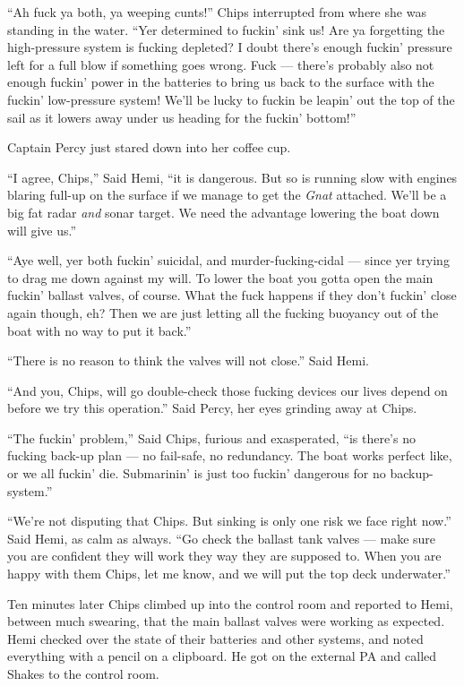 \documentclass[
]{scrbook}
\begin{document}
``Ah fuck ya both, ya weeping cunts!'' Chips interrupted from where she
was standing in the water. ``Yer determined to fuckin' sink us! Are ya
forgetting the high-pressure system is fucking depleted? I doubt there's
enough fuckin' pressure left for a full blow if something goes wrong.
Fuck --- there's probably also not enough fuckin' power in the batteries
to bring us back to the surface with the fuckin' low-pressure system!
We'll be lucky to fuckin be leapin' out the top of the sail as it lowers
away under us heading for the fuckin' bottom!''

Captain Percy just stared down into her coffee cup.

``I agree, Chips,'' Said Hemi, ``it is dangerous. But so is running slow
with engines blaring full-up on the surface if we manage to get the
\emph{Gnat} attached. We'll be a big fat radar \emph{and} sonar target.
We need the advantage lowering the boat down will give us.''

``Aye well, yer both fuckin' suicidal, and murder-fucking-cidal ---
since yer trying to drag me down against my will. To lower the boat you
gotta open the main fuckin' ballast valves, of course. What the fuck
happens if they don't fuckin' close again though, eh? Then we are just
letting all the fucking buoyancy out of the boat with no way to put it
back.''

``There is no reason to think the valves will not close.'' Said Hemi.

``And you, Chips, will go double-check those fucking devices our lives
depend on before we try this operation.'' Said Percy, her eyes grinding
away at Chips.

``The fuckin' problem,'' Said Chips, furious and exasperated, ``is
there's no fucking back-up plan --- no fail-safe, no redundancy. The
boat works perfect like, or we all fuckin' die. Submarinin' is just too
fuckin' dangerous for no backup-system.''

``We're not disputing that Chips. But sinking is only one risk we face
right now.'' Said Hemi, as calm as always. ``Go check the ballast tank
valves --- make sure you are confident they will work they way they are
supposed to. When you are happy with them Chips, let me know, and we
will put the top deck underwater.''

Ten minutes later Chips climbed up into the control room and reported to
Hemi, between much swearing, that the main ballast valves were working
as expected. Hemi checked over the state of their batteries and other
systems, and noted everything with a pencil on a clipboard. He got on
the external PA and called Shakes to the control room.
\end{document}
